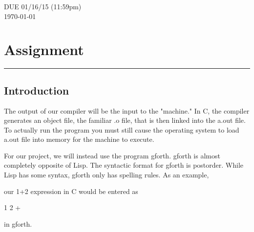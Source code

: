 \documentclass[letterpaper,10pt]{article}
\begin{document}
\begin{titlepage}

DUE 01/16/15 (11:59pm)\\
{\large \today}\\[3cm] %


 

\vfill %

\end{titlepage}

\tableofcontents
\vfill %
\newpage


\section{Assignment} \hrule
\subsection{Introduction} 
The output of our compiler will be the input to the "machine." In C, the compiler generates an object file, the familiar .o file, that is then linked into the a.out file. To actually run the program you must still cause the operating system to load a.out file into memory for the machine to execute.

For our project, we will instead use the program gforth. gforth is almost completely opposite of Lisp. The syntactic format for gforth is postorder. While Lisp has some syntax, gforth only has spelling rules. As an example,

our 1+2 expression in C would be entered as

1 2 +

in gforth.
\end{document}
